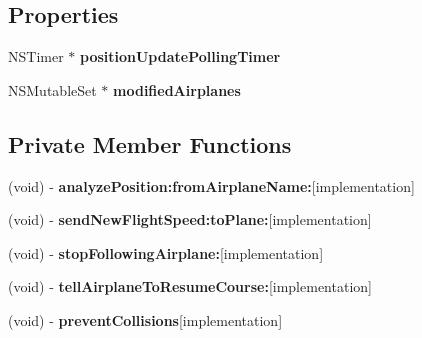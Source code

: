 \subsection*{\-Properties}
\begin{DoxyCompactItemize}
\item 
\hypertarget{class_zone_controller_a650f6ae4f4342c891d7031d942b5fb5f}{
\-N\-S\-Timer $\ast$ {\bfseries position\-Update\-Polling\-Timer}}
\label{class_zone_controller_a650f6ae4f4342c891d7031d942b5fb5f}

\item 
\hypertarget{class_zone_controller_a1dbc7af756068d82dbca8478fa99aa21}{
\-N\-S\-Mutable\-Set $\ast$ {\bfseries modified\-Airplanes}}
\label{class_zone_controller_a1dbc7af756068d82dbca8478fa99aa21}

\end{DoxyCompactItemize}
\subsection*{\-Private \-Member \-Functions}
\begin{DoxyCompactItemize}
\item 
\hypertarget{class_zone_controller_a92ba61e4c98a97aa3d2d7f9114a269f1}{
(void) -\/ {\bfseries analyze\-Position\-:from\-Airplane\-Name\-:}{\ttfamily  \mbox{[}implementation\mbox{]}}}
\label{class_zone_controller_a92ba61e4c98a97aa3d2d7f9114a269f1}

\item 
\hypertarget{class_zone_controller_ae00cdc269ca0a2be7ef638d1f7e1c068}{
(void) -\/ {\bfseries send\-New\-Flight\-Speed\-:to\-Plane\-:}{\ttfamily  \mbox{[}implementation\mbox{]}}}
\label{class_zone_controller_ae00cdc269ca0a2be7ef638d1f7e1c068}

\item 
\hypertarget{class_zone_controller_a23522f80b13401cef68f341f5462a604}{
(void) -\/ {\bfseries stop\-Following\-Airplane\-:}{\ttfamily  \mbox{[}implementation\mbox{]}}}
\label{class_zone_controller_a23522f80b13401cef68f341f5462a604}

\item 
\hypertarget{class_zone_controller_af82b81965122d5251df5246f8f13f653}{
(void) -\/ {\bfseries tell\-Airplane\-To\-Resume\-Course\-:}{\ttfamily  \mbox{[}implementation\mbox{]}}}
\label{class_zone_controller_af82b81965122d5251df5246f8f13f653}

\item 
\hypertarget{class_zone_controller_a4adf397ee3e43b0cb7d0f82d698e9830}{
(void) -\/ {\bfseries prevent\-Collisions}{\ttfamily  \mbox{[}implementation\mbox{]}}}
\label{class_zone_controller_a4adf397ee3e43b0cb7d0f82d698e9830}

\end{DoxyCompactItemize}


